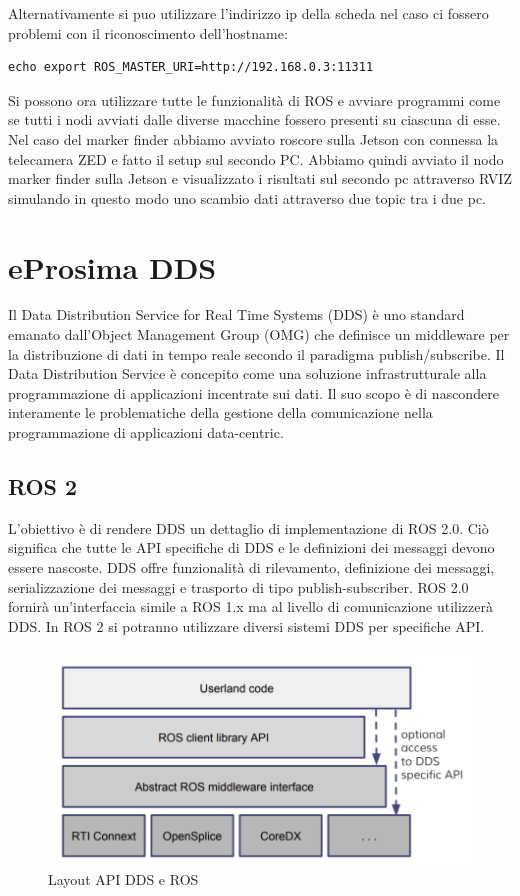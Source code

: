 \documentclass[a4paper]{article}
\begin{document}
Alternativamente si puo utilizzare l'indirizzo ip della scheda nel caso ci fossero problemi con il riconoscimento dell'hostname:
\begin{verbatim}
echo export ROS_MASTER_URI=http://192.168.0.3:11311
\end{verbatim}
Si possono ora utilizzare tutte le funzionalità di ROS e avviare programmi come se tutti i nodi avviati dalle diverse macchine fossero presenti su ciascuna di esse.
Nel caso del marker finder abbiamo avviato roscore sulla Jetson con connessa la telecamera ZED e fatto il setup sul secondo PC.
Abbiamo quindi avviato il nodo marker finder sulla Jetson e visualizzato i risultati sul secondo pc attraverso RVIZ simulando in questo modo uno scambio dati attraverso due topic tra i due pc.

\newpage
\section{eProsima DDS}
Il Data Distribution Service for Real Time Systems (DDS) è uno standard emanato dall'Object Management Group (OMG) che definisce un middleware per la distribuzione di dati in tempo reale secondo il paradigma publish/subscribe.
Il Data Distribution Service è concepito come una soluzione infrastrutturale alla programmazione di applicazioni incentrate sui dati. Il suo scopo è di nascondere interamente le problematiche della gestione della comunicazione nella programmazione di applicazioni data-centric.

\subsection{ROS 2}
L'obiettivo è di rendere DDS un dettaglio di implementazione di ROS 2.0. Ciò significa che tutte le API specifiche di DDS e le definizioni dei messaggi devono essere nascoste. DDS offre funzionalità di rilevamento, definizione dei messaggi, serializzazione dei messaggi e trasporto di tipo publish-subscriber.
ROS 2.0 fornirà un'interfaccia simile a ROS 1.x ma al livello di comunicazione utilizzerà DDS. In ROS 2 si potranno utilizzare diversi sistemi DDS per specifiche API.

\begin{figure}[htbp]
\centering
\includegraphics[scale=0.5]{dds_img.PNG} 
\caption{Layout API DDS e ROS}
\end{figure}
\end{document}
